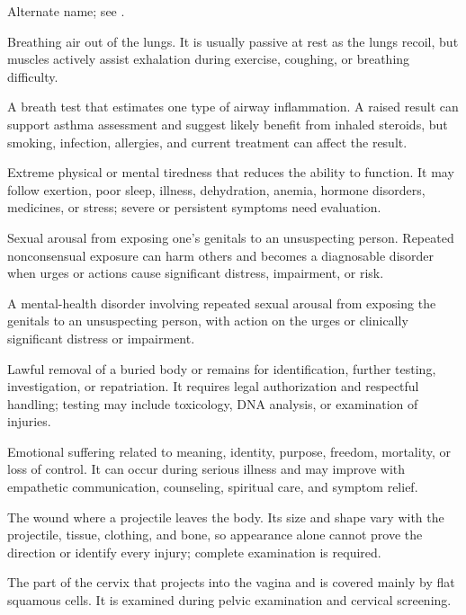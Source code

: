  Alternate name; see .

 Breathing air out of the lungs. It is usually passive at rest as the lungs recoil, but muscles actively assist exhalation during exercise, coughing, or breathing difficulty.

 A breath test that estimates one type of airway inflammation. A raised result can support asthma assessment and suggest likely benefit from inhaled steroids, but smoking, infection, allergies, and current treatment can affect the result.

 Extreme physical or mental tiredness that reduces the ability to function. It may follow exertion, poor sleep, illness, dehydration, anemia, hormone disorders, medicines, or stress; severe or persistent symptoms need evaluation.

 Sexual arousal from exposing one’s genitals to an unsuspecting person. Repeated nonconsensual exposure can harm others and becomes a diagnosable disorder when urges or actions cause significant distress, impairment, or risk.

 A mental-health disorder involving repeated sexual arousal from exposing the genitals to an unsuspecting person, with action on the urges or clinically significant distress or impairment.

 Lawful removal of a buried body or remains for identification, further testing, investigation, or repatriation. It requires legal authorization and respectful handling; testing may include toxicology, DNA analysis, or examination of injuries.

 Emotional suffering related to meaning, identity, purpose, freedom, mortality, or loss of control. It can occur during serious illness and may improve with empathetic communication, counseling, spiritual care, and symptom relief.

 The wound where a projectile leaves the body. Its size and shape vary with the projectile, tissue, clothing, and bone, so appearance alone cannot prove the direction or identify every injury; complete examination is required.

 The part of the cervix that projects into the vagina and is covered mainly by flat squamous cells. It is examined during pelvic examination and cervical screening.

